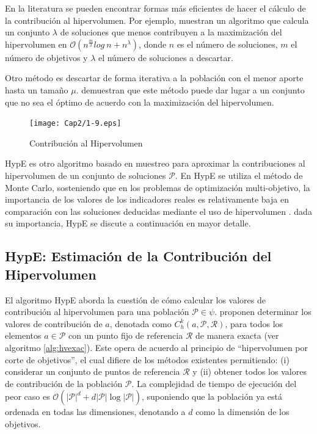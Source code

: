   En la literatura se pueden encontrar formas m\'as eficientes de hacer el c\'alculo de la contribuci\'on al 
   hipervolumen. Por ejemplo, \cite{bringmann} muestran un algoritmo que calcula un conjunto $\lambda$ de soluciones 
   que menos contribuyen a la maximizaci\'on del hipervolumen en $\mathcal{O}(n^{\frac{m}{2}} log~n + n^{\lambda})$, 
   donde $n$ es el n\'umero de soluciones, $m$ el n\'umero de objetivos y $\lambda$ el n\'umero de soluciones a 
   descartar.
 
    Otro m\'etodo es descartar de forma iterativa a la poblaci\'on con el menor aporte hasta un tama\~no $\mu$. 
    \cite{Bringmann2} demuestran que este m\'etodo puede dar lugar a un conjunto que no sea el \'optimo de acuerdo con la 
    maximizaci\'on del hipervolumen. 

    \begin{figure}
    \centering
    \texttt{[image: Cap2/1-9.eps]}
    \caption{Contribuci\'on al Hipervolumen}
    \label{fig:hypcont}
    \end{figure}
   
    HypE es otro algoritmo basado en muestreo para aproximar la contribuciones al hipervolumen de un conjunto de 
    soluciones $\mathcal{P}$. En HypE se utiliza el m\'etodo de Monte Carlo, sosteniendo que en los 
    problemas de optimizaci\'on multi-objetivo, la importancia de los valores de los indicadores reales es relativamente baja 
    en comparaci\'on con las soluciones deducidas mediante el uso de hipervolumen \cite{Bader11}. dada su importancia, HypE
    se discute a continuaci\'on en mayor detalle.
    
  \subsection{HypE: Estimaci\'on de la Contribuci\'on del Hipervolumen}
  
  El algoritmo HypE aborda la cuesti\'on de c\'omo calcular los valores de contribuci\'on al hipervolumen 
  para una poblaci\'on $\mathcal{P} \in \psi$.  \cite{Bader11} proponen determinar los valores de contribuci\'on
  de $a$, denotada como $C^k_h\left(a,\mathcal{P},\mathcal{R} \right)$, para todos los elementos $a \in \mathcal{P}$ con 
  un punto fijo de referencia $\mathcal{R}$ de manera exacta (ver algoritmo \ref{alg:hvexac}). Este opera de acuerdo al principio de ``hipervolumen por corte 
  de objetivos'', el cual difiere de los m\'etodos existentes permitiendo: (i) considerar un conjunto de puntos de 
  referencia $\mathcal{R}$ y (ii) obtener todos los valores de contribuci\'on de la poblaci\'on $\mathcal{P}$. La complejidad 
  de tiempo de ejecuci\'on del peor caso es  $\mathcal{O}(|\mathcal{P}|^d + d|\mathcal{P}|\log |\mathcal{P}|)$, suponiendo que 
  la poblaci\'on ya est\'a ordenada en todas las dimensiones, denotando a $d$ como la dimensi\'on de los objetivos. 
  
